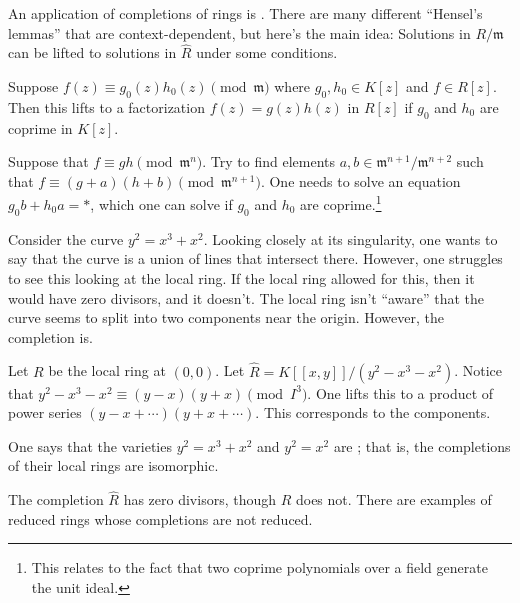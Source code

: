 \documentclass [11 pt, oneside] {article}
\begin{document}
An application of completions of rings is . There are many different ``Hensel's lemmas'' that are context-dependent, but here's the main idea: Solutions in $R/\mathfrak{m}$ can be lifted to solutions in $\widehat{R}$ under some conditions.

\begin{example}\label{}\text{}
Suppose $f(z)\equiv g_0(z) h_0(z)\pmod{\mathfrak{m}}$ where $g_0,h_0\in K[z]$ and $f\in R[z]$. Then this lifts to a factorization $f(z)=g (z)h (z)$ in $R[z]$ if $g_0$ and $h_0$ are coprime in $K[z]$.
\end{example}

\begin{esquisse}
	Suppose that $f\equiv gh\pmod{\mathfrak{m}^n}$. Try to find elements $a,b\in \mathfrak{m}^{n+1}/\mathfrak{m}^{n+2}$ such that $f\equiv (g+a) (h+b)\pmod { \mathfrak{m}^{n+1}}$. One needs to solve an equation $g_0b+h_0a = *$, which one can solve if $g_0$ and $h_0$ are coprime.\footnote{This relates to the fact that two coprime polynomials over a field generate the unit ideal.}
\end{esquisse}

\begin{example}[ ]\label{}\text{}
Consider the curve $y^2 = x^3+x^2$. Looking closely at its singularity, one wants to say that the curve is a union of lines that intersect there. However, one struggles to see this looking at the local ring. If the local ring allowed for this, then it would have zero divisors, and it doesn't. The local ring isn't ``aware'' that the curve seems to split into two components near the origin. However, the completion is. 

Let $R$ be the local ring at $(0,0)$. Let $\widehat{R} = K [\![x,y]\!]/(y^2-x^3-x^2)$. Notice that $y^2-x^3-x^2\equiv (y-x) (y+x)\pmod {I^3}$. One lifts this to a product of power series $(y-x+\cdots) (y+x+\cdots)$. This corresponds to the components.
\end{example}

\begin{remark}
	One says that the varieties $y^2=x^3+x^2$ and $y^2=x^2$ are ; that is, the completions of their local rings are isomorphic.
\end{remark}

\begin{remark}
	The completion $\widehat{R}$ has zero divisors, though $R$ does not. There are examples of reduced rings whose completions are not reduced.
\end{remark}
\end{document}
